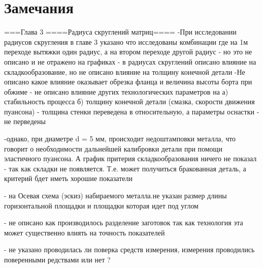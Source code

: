 
\section{Замечания}

===Глава 3
====Радиуса скруглений матриц====
-При исследовании радиусов скругления в главе 3 указано что исследованы комбинации где на 1м переходе вытяжки один радиус, а на втором переходе другой радиус - но это не описано и не отражено на графиках
- в радиусах скруглений описано влияние на складкообразование, но не описано влияние на толщину конечной детали
-Не описано какое влияние оказывает обрезка фланца и величина высоты борта при обжиме
- не описано влияние других технологических параметров на а) стабильность процесса б) толщину конечной детали (смазка, скорости движения пуансона)
- толщина стенки переведена в относительную, а параметры оснастки - не перведены

-однако, при диаметре d = 5 мм, происходит недоштамповки металла, что говорит о необходимости дальнейшей калибровки детали при помощи эластичного пуансона. А график притерия складкообразования ничего не показал - так как складки не появляется. Т.е. может получиться бракованная деталь, а критерий бдет иметь хорошие показатели

- на Осевая схема (эскиз) набираемого металла.не указан размер длины горизонтальной площадки и площадки которая идет под углом

- не описано как производилось разделение заготовок так как технология эта может существенно влиять на точность показателей

- не указано проводилась ли поверка средств измерения, измерения проводились поверенными редствами или нет ? 






